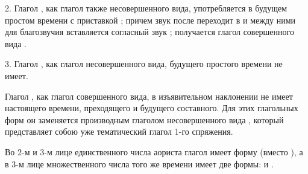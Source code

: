 \documentclass[11pt,a4paper,oneside]{memoir}
\begin{document}
2. Глагол {}, как глагол также несовершенного вида, употребляется в будущем простом времени с приставкой {}; причем звук {} после {} переходит в {} и между ними для благозвучия вставляется согласный звук {}; получается глагол совершенного вида {}.

3. Глагол {}, как глагол несовершенного вида, будущего простого времени не имеет.

Глагол {}, как глагол совершенного вида, в изъявительном наклонении не имеет настоящего времени, преходящего и будущего составного. Для этих глагольных форм он заменяется производным глаголом несовершенного вида {}, который представляет собою уже тематический глагол 1-го спряжения.

Во 2-м и 3-м лице единственного числа аориста глагол {} имеет форму {} (вместо {}), а в 3-м лице множественного числа того же времени имеет две формы: {} и {}.
\end{document}
